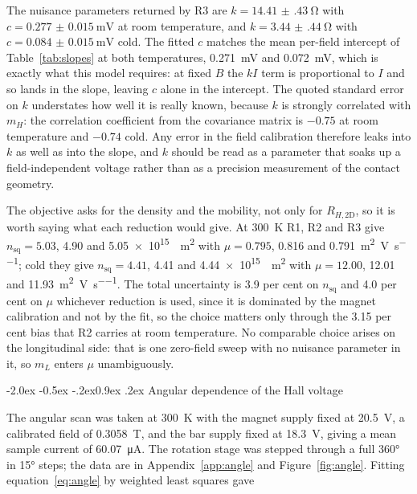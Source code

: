 \documentclass[11pt,a4paper]{article}
\makeatletter
\renewcommand\subsection{\@startsection{subsection}{2}{\z@}%
  {-2.0ex \@plus -0.5ex \@minus -.2ex}{0.9ex \@plus .2ex}%
  {\normalfont\normalsize\bfseries}}
\newcommand{\Rhtwod}{R_{H,\mathrm{2D}}}
\newcommand{\nsq}{n_{\mathrm{sq}}}
\makeatother
\begin{document}
The nuisance parameters returned by R3 are $k = \qty{14.41(43)}{\ohm}$ with
$c = \qty{+0.277(15)}{\milli\volt}$ at room temperature, and $k = \qty{3.44(44)}{\ohm}$
with $c = \qty{+0.084(15)}{\milli\volt}$ cold. The fitted $c$ matches the mean per-field
intercept of Table~\ref{tab:slopes} at both temperatures, \qty{0.271}{\milli\volt} and
\qty{0.072}{\milli\volt}, which is exactly what this model requires: at fixed $B$ the $kI$
term is proportional to $I$ and so lands in the slope, leaving $c$ alone in the intercept. The quoted standard error on $k$ understates how well it is really known, because
$k$ is strongly correlated with $m_H$: the correlation coefficient from the covariance matrix
is $-0.75$ at room temperature and $-0.74$ cold. Any error in the field calibration therefore
leaks into $k$ as well as into the slope, and $k$ should be read as a parameter that soaks up
a field-independent voltage rather than as a precision measurement of the contact geometry.

The objective asks for the density and the mobility, not only for $\Rhtwod$, so it is worth
saying what each reduction would give. At \qty{300}{\kelvin} R1, R2 and R3 give
$\nsq = \num{5.03}$, \num{4.90} and \qty{5.05e15}{\per\metre\squared} with
$\mu = \num{0.795}$, \num{0.816} and
\qty{0.791}{\metre\squared\per\volt\per\second}; cold they give $\nsq = \num{4.41}$,
\num{4.41} and \qty{4.44e15}{\per\metre\squared} with $\mu = \num{12.00}$, \num{12.01} and
\qty{11.93}{\metre\squared\per\volt\per\second}. The total uncertainty is \num{3.9} per cent
on $\nsq$ and \num{4.0} per cent on $\mu$ whichever reduction is used, since it is dominated
by the magnet calibration and not by the fit, so the choice matters only through the
\num{3.15} per cent bias that R2 carries at room temperature. No comparable choice arises on
the longitudinal side: that is one zero-field sweep with no nuisance parameter in it, so
$m_L$ enters $\mu$ unambiguously.

\subsection{Angular dependence of the Hall voltage}
\label{sec:angle}

The angular scan was taken at \qty{300}{\kelvin} with the magnet supply fixed at
\qty{20.5}{\volt}, a calibrated field of \qty{0.3058}{\tesla}, and the bar supply fixed at
\qty{18.3}{\volt}, giving a mean sample current of \qty{60.07}{\micro\ampere}. The rotation
stage was stepped through a full \ang{360} in \ang{15} steps; the data are in
Appendix~\ref{app:angle} and Figure~\ref{fig:angle}. Fitting equation~\eqref{eq:angle} by
weighted least squares gave
\end{document}
